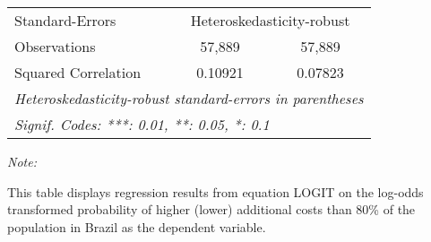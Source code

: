 \begin{table}[htbp!]
\begin{adjustbox}{width = 1\textwidth, max height = 0.95\textheight, center}
\begin{threeparttable}[b]
\begin{tabular}{lcc}
            \midrule 
            Standard-Errors & \multicolumn{2}{c}{Heteroskedasticity-robust} \\ 
            Observations          & 57,889         & 57,889\\  
            Squared Correlation   & 0.10921        & 0.07823\\  
            \midrule \midrule
            \multicolumn{3}{l}{\emph{Heteroskedasticity-robust standard-errors in parentheses}}\\
            \multicolumn{3}{l}{\emph{Signif. Codes: ***: 0.01, **: 0.05, *: 0.1}}\\
         \end{tabular}
         
         \begin{tablenotes}\item \medskip \textit{Note:}
            \item This table displays regression results from equation LOGIT on the log-odds transformed probability of higher (lower) additional costs than 80\% of the population in Brazil as the dependent variable. 
         \end{tablenotes}
      \end{threeparttable}
   \end{adjustbox}
\end{table}


